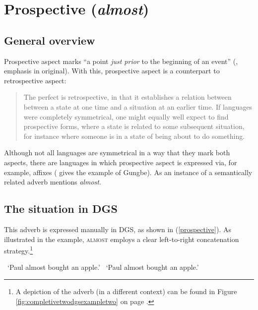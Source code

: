 
\section{Prospective (\textit{almost})}
\subsection{General overview}
Prospective aspect marks ``a point \textit{just prior} to the beginning of an event'' (\citealt[332]{frawley1992linguistic}, emphasis in original). With this, prospective aspect is a counterpart to retrospective aspect:

\begin{quote}
The perfect is retrospective, in that it establishes a relation between between a state at one time and a situation at an earlier time. If languages were completely symmetrical, one might equally well expect to find prospective forms, where a state is related to some subsequent situation, for instance where someone is in a state of being about to do something. \citep[64]{comrie1976aspect}
\end{quote}

\noindent Although not all languages are symmetrical in a way that they mark both aspects, there are languages in which prospective aspect is expressed via, for example, affixes (\citealt[99]{cinque1999adverbs} gives the example of Gungbe). As an instance of a semantically related adverb \citet[99]{cinque1999adverbs} mentions \textit{almost}.

\subsection{The situation in DGS}
This adverb is expressed manually in DGS, as shown in (\ref{prospective}). As illustrated in the example, \textsc{almost} employs a clear left-to-right concatenation strategy.\footnote{ A depiction of the adverb (in a different context) can be found in Figure \ref{fig:completivetwodgsexampletwo} on page \pageref{fig:completivetwodgsexampletwo}.}

\begin{exe}
\ex\label{prospective}\begin{xlist} 
\glt \textcolor{white}{*}`Paul almost bought an apple.' \label{ex:retrospectivea}
\glt \textcolor{white}{*}`Paul almost bought an apple.' \label{ex:retrospectivea}
\end{xlist}
\end{exe} 

